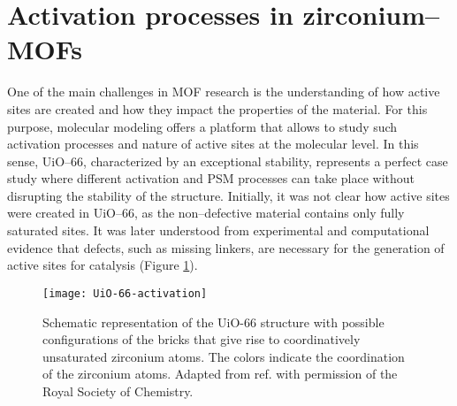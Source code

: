 \section{Activation processes in zirconium--MOFs}
One of the main challenges in MOF research is the understanding of how active sites are created and how they impact the properties of the material. For this purpose, molecular modeling offers a platform that allows to study such activation processes and nature of active sites at the molecular level. In this sense, UiO--66, characterized by an exceptional stability, represents a perfect case study where different activation and PSM processes can take place without disrupting the stability of the structure. Initially, it was not clear how active sites were created in UiO--66, as the non--defective material contains only fully saturated sites. It was later understood from experimental and computational evidence\cite{vermoortele2012electronic} that defects, such as missing linkers, are necessary for the generation of active sites for catalysis (Figure \ref{fig:UiO-66-activation}).
\begin{figure}[!htbp]
	\centering
	\texttt{[image: UiO-66-activation]}
	\caption{Schematic representation of the UiO-66 structure with possible configurations of the bricks that give rise to coordinatively unsaturated zirconium atoms. The colors indicate the coordination of the zirconium atoms. Adapted from ref. \cite{hajek2018intrinsic} with permission of the Royal Society of Chemistry.}
	\label{fig:UiO-66-activation}
\end{figure}
